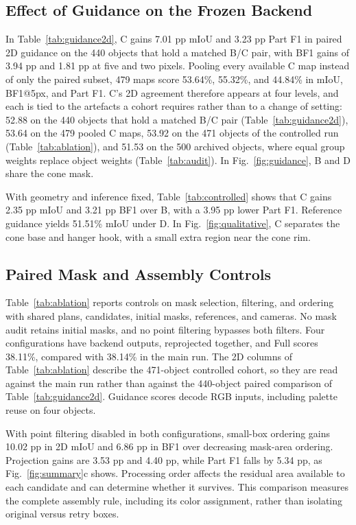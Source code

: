 \documentclass[pdflatex,sn-mathphys-ay]{sn-jnl}
\begin{document}
\subsection{Effect of Guidance on the Frozen Backend}
In Table~\ref{tab:guidance2d}, C gains 7.01 pp mIoU and 3.23 pp Part F1 in paired 2D guidance on the 440 objects that hold a matched B/C pair, with BF1 gains of 3.94 pp and 1.81 pp at five and two pixels. Pooling every available C map instead of only the paired subset, 479 maps score 53.64\%, 55.32\%, and 44.84\% in mIoU, BF1@5px, and Part F1. C's 2D agreement therefore appears at four levels, and each is tied to the artefacts a cohort requires rather than to a change of setting: 52.88 on the 440 objects that hold a matched B/C pair (Table~\ref{tab:guidance2d}), 53.64 on the 479 pooled C maps, 53.92 on the 471 objects of the controlled run (Table~\ref{tab:ablation}), and 51.53 on the 500 archived objects, where equal group weights replace object weights (Table~\ref{tab:audit}). In Fig.~\ref{fig:guidance}, B and D share the cone mask.

With geometry and inference fixed, Table~\ref{tab:controlled} shows that C gains 2.35 pp mIoU and 3.21 pp BF1 over B, with a 3.95 pp lower Part F1. Reference guidance yields 51.51\% mIoU under D. In Fig.~\ref{fig:qualitative}, C separates the cone base and hanger hook, with a small extra region near the cone rim.

\subsection{Paired Mask and Assembly Controls}
Table~\ref{tab:ablation} reports controls on mask selection, filtering, and ordering with shared plans, candidates, initial masks, references, and cameras. No mask audit retains initial masks, and no point filtering bypasses both filters. Four configurations have backend outputs, reprojected together, and Full scores 38.11\%, compared with 38.14\% in the main run. The 2D columns of Table~\ref{tab:ablation} describe the 471-object controlled cohort, so they are read against the main run rather than against the 440-object paired comparison of Table~\ref{tab:guidance2d}. Guidance scores decode RGB inputs, including palette reuse on four objects.

With point filtering disabled in both configurations, small-box ordering gains 10.02 pp in 2D mIoU and 6.86 pp in BF1 over decreasing mask-area ordering. Projection gains are 3.53 pp and 4.40 pp, while Part F1 falls by 5.34 pp, as Fig.~\ref{fig:summary}c shows. Processing order affects the residual area available to each candidate and can determine whether it survives. This comparison measures the complete assembly rule, including its color assignment, rather than isolating original versus retry boxes.
\end{document}
